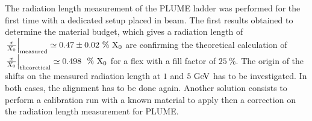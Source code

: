   The radiation length measurement of the \gls{PLUME} ladder was performed for the first time with a dedicated setup placed in beam.
  The first results obtained to determine the material budget, which gives a radiation length of $\left. \frac{x}{X_0} \right|_{\rm{measured}} \simeq 0.47 \pm 0.02~\%~\rm{X_0}$ are confirming the theoretical calculation of $\left. \frac{x}{X_0}\right|_{\rm{theoretical}} \simeq 0.498~~\%~\rm{X_0}$ for a flex with a fill factor of $25~\%$.
  The origin of the shifts on the measured radiation length at $1$ and $5~\rm{GeV}$ has to be investigated.
  In both cases, the alignment has to be done again.
  Another solution consists to perform a calibration run with a known material to apply then a correction on the radiation length measurement for \gls{PLUME}.

